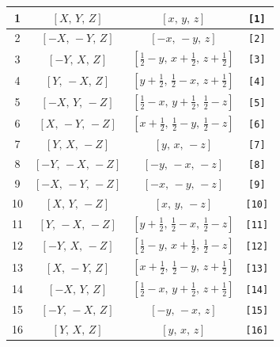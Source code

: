 \documentclass[fleqn,8pt]{jsarticle}
\begin{document}
\begin{longtable}{cccc}
1 & $\left[ X,\, Y,\, Z \right]$ & $\left[ x,\, y,\, z \right]$ & {\tt [1]} \\ \hline
2 & $\left[ - X,\, - Y,\, Z \right]$ & $\left[ - x,\, - y,\, z \right]$ & {\tt [2]} \\ \hline
3 & $\left[ - Y,\, X,\, Z \right]$ & $\left[ \frac{1}{2} - y,\, x + \frac{1}{2},\, z + \frac{1}{2} \right]$ & {\tt [3]} \\ \hline
4 & $\left[ Y,\, - X,\, Z \right]$ & $\left[ y + \frac{1}{2},\, \frac{1}{2} - x,\, z + \frac{1}{2} \right]$ & {\tt [4]} \\ \hline
5 & $\left[ - X,\, Y,\, - Z \right]$ & $\left[ \frac{1}{2} - x,\, y + \frac{1}{2},\, \frac{1}{2} - z \right]$ & {\tt [5]} \\ \hline
6 & $\left[ X,\, - Y,\, - Z \right]$ & $\left[ x + \frac{1}{2},\, \frac{1}{2} - y,\, \frac{1}{2} - z \right]$ & {\tt [6]} \\ \hline
7 & $\left[ Y,\, X,\, - Z \right]$ & $\left[ y,\, x,\, - z \right]$ & {\tt [7]} \\ \hline
8 & $\left[ - Y,\, - X,\, - Z \right]$ & $\left[ - y,\, - x,\, - z \right]$ & {\tt [8]} \\ \hline
9 & $\left[ - X,\, - Y,\, - Z \right]$ & $\left[ - x,\, - y,\, - z \right]$ & {\tt [9]} \\ \hline
10 & $\left[ X,\, Y,\, - Z \right]$ & $\left[ x,\, y,\, - z \right]$ & {\tt [10]} \\ \hline
11 & $\left[ Y,\, - X,\, - Z \right]$ & $\left[ y + \frac{1}{2},\, \frac{1}{2} - x,\, \frac{1}{2} - z \right]$ & {\tt [11]} \\ \hline
12 & $\left[ - Y,\, X,\, - Z \right]$ & $\left[ \frac{1}{2} - y,\, x + \frac{1}{2},\, \frac{1}{2} - z \right]$ & {\tt [12]} \\ \hline
13 & $\left[ X,\, - Y,\, Z \right]$ & $\left[ x + \frac{1}{2},\, \frac{1}{2} - y,\, z + \frac{1}{2} \right]$ & {\tt [13]} \\ \hline
14 & $\left[ - X,\, Y,\, Z \right]$ & $\left[ \frac{1}{2} - x,\, y + \frac{1}{2},\, z + \frac{1}{2} \right]$ & {\tt [14]} \\ \hline
15 & $\left[ - Y,\, - X,\, Z \right]$ & $\left[ - y,\, - x,\, z \right]$ & {\tt [15]} \\ \hline
16 & $\left[ Y,\, X,\, Z \right]$ & $\left[ y,\, x,\, z \right]$ & {\tt [16]} \\
\end{longtable}
\end{document}
